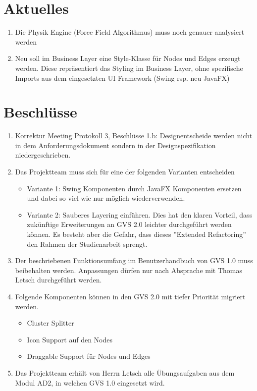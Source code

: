 \documentclass[11pt, a4paper,oneside]{scrartcl}
\begin{document}
\section{Aktuelles}
\begin{enumerate}
	\item Die Physik Engine (Force Field Algorithmus) muss noch genauer analysiert werden
	\item Neu soll im Business Layer eine Style-Klasse für Nodes und Edges erzeugt werden. Diese repräsentiert das Styling im Business Layer, ohne spezifische Imports aus dem eingesetzten UI Framework (Swing rsp. neu JavaFX)
\end{enumerate}

\section{Beschlüsse}
\begin{enumerate}
	\item Korrektur Meeting Protokoll 3, Beschlüsse 1.b: Designentscheide werden nicht in dem Anforderungsdokument sondern in der Designspezifikation niedergeschrieben.
	\item Das Projektteam muss sich für eine der folgenden Varianten entscheiden
	\begin{itemize}
		\item Variante 1: Swing Komponenten durch JavaFX Komponenten ersetzen und dabei so viel wie nur möglich wiederverwenden.
		\item Variante 2: Sauberes Layering einführen. Dies hat den klaren Vorteil, dass zukünftige Erweiterungen an GVS 2.0 leichter durchgeführt werden können. Es besteht aber die Gefahr, dass dieses ''Extended Refactoring'' den Rahmen der Studienarbeit sprengt.
	\end{itemize}
	\item Der beschriebenen Funktionsumfang im Benutzerhandbuch von GVS 1.0 muss beibehalten werden. Anpassungen dürfen nur nach Absprache mit Thomas Letsch durchgeführt werden.
	\item Folgende Komponenten können in den GVS 2.0 mit tiefer Priorität migriert werden.
	\begin{itemize}
		\item Cluster Splitter
		\item Icon Support auf den Nodes
		\item Draggable Support für Nodes und Edges
	\end{itemize}
	\item Das Projektteam erhält von Herrn Letsch alle Übungsaufgaben aus dem Modul AD2, in welchen GVS 1.0 eingesetzt wird.
\end{enumerate}
\end{document}
